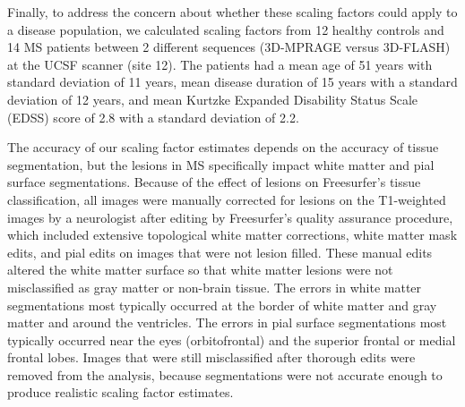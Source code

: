 Finally, to address the concern about whether these scaling factors could apply to a disease population, we calculated scaling factors from 12 healthy controls and 14 MS patients between 2 different sequences (3D-MPRAGE  versus 3D-FLASH) at the UCSF scanner (site 12). The patients had a mean age of 51 years with standard deviation of 11 years, mean disease duration of 15 years with a standard deviation of 12 years, and mean Kurtzke Expanded Disability Status Scale (EDSS) \cite{Kurtzke_1983} score of 2.8 with a standard deviation of 2.2. 

The accuracy of our scaling factor estimates depends on the accuracy of tissue segmentation, but the lesions in MS specifically impact white matter and pial surface segmentations. Because of the effect of lesions on Freesurfer's tissue classification, all images were manually corrected for lesions on the T1-weighted images by a neurologist after editing by Freesurfer's quality assurance procedure, which included extensive topological white matter corrections, white matter mask edits, and pial edits on images that were not lesion filled.  These manual edits altered the white matter surface so that white matter lesions were not misclassified as gray matter or non-brain tissue. The errors in white matter segmentations most typically occurred at the border of white matter and gray matter and around the ventricles. The errors in pial surface segmentations most typically occurred near the eyes (orbitofrontal) and the superior frontal or medial frontal lobes. Images that were still misclassified after thorough edits were removed from the analysis, because segmentations were not accurate enough to produce realistic scaling factor estimates.